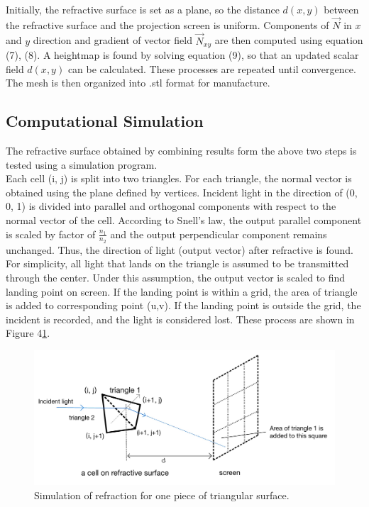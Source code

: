 \documentclass[10pt,two column]{configuration/unoesc}
\begin{document}
Initially, the refractive surface is set as a plane, so the distance $d(x,y)$ between the refractive surface and the projection screen is uniform. Components of $\vec N$ in $x$ and $y$ direction and gradient of vector field $ \vec N_{xy}$ are then computed using equation (7), (8). A heightmap is found by solving equation (9), so that an updated scalar field $d(x,y)$ can be calculated. These processes are repeated until convergence. The mesh is then organized into .stl format for manufacture.\\

\subsection{Computational Simulation}
The refractive surface obtained by combining results form the above two steps is tested using a simulation program.\\

Each cell (i, j) is split into two triangles. For each triangle, the normal vector is obtained using the plane defined by vertices. Incident light in the direction of (0, 0, 1) is divided into parallel and orthogonal components with respect to the normal vector of the cell. According to Snell's law, the output parallel component is scaled by factor of $\frac{n_1}{n_2}$ and the output perpendicular component remains unchanged. Thus, the direction of light (output vector) after refractive is found. For simplicity, all light that lands on the triangle is assumed to be transmitted through the center. Under this assumption, the output vector is scaled to find landing point on screen. If the landing point is within a grid, the area of triangle is added to corresponding point (u,v). If the landing point is outside the grid, the incident is recorded, and the light is considered lost. These process are shown in Figure 4\ref{fig:4}.\\

\begin{figure}[h!]
\centering
\includegraphics[width=1.0\linewidth]{figures/simulation.jpg} 
\caption{Simulation of refraction for one piece of triangular surface.}
\label{fig:4}
\end{figure}
\end{document}
